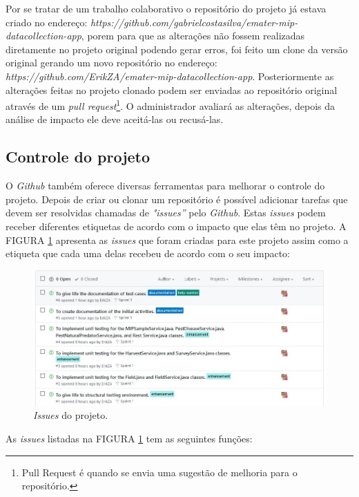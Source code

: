  Por se tratar de um trabalho colaborativo o repositório do projeto já estava criado no endereço: \textit{https://github.com/gabrielcostasilva/emater-mip-datacollection-app}, porem para que as alterações não fossem realizadas diretamente no projeto original podendo gerar erros, foi feito um clone da versão original gerando um novo repositório no endereço: \textit{https://github.com/ErikZA/emater-mip-datacollection-app}. Posteriormente as alterações feitas no projeto clonado podem ser enviadas ao repositório original através de um \textit{pull request}\footnote{Pull Request é quando se envia uma sugestão de melhoria para o repositório.}. O administrador avaliará as alterações, depois da análise de impacto ele deve aceitá-las ou recusá-las.




\subsection{Controle do projeto}

O \textit{Github} também oferece diversas ferramentas para melhorar o controle do projeto. Depois de criar ou clonar um repositório é possível adicionar tarefas que devem ser resolvidas chamadas de \textit{"issues”} pelo \textit{Github}. Estas \textit{issues} podem receber diferentes etiquetas de acordo com o impacto que elas têm no projeto. A FIGURA \ref{issues} apresenta as \textit{issues} que foram criadas para este projeto assim como a etiqueta que cada uma delas recebeu de acordo com o seu impacto:

\begin{figure}[H]
	\centering
	\includegraphics[scale=0.7]{dados/figuras/issues.JPG}
	\caption{\textit{Issues} do projeto.}
	\label{issues}
\end{figure}


As \textit{issues} listadas na FIGURA \ref{issues} tem as seguintes funções:


